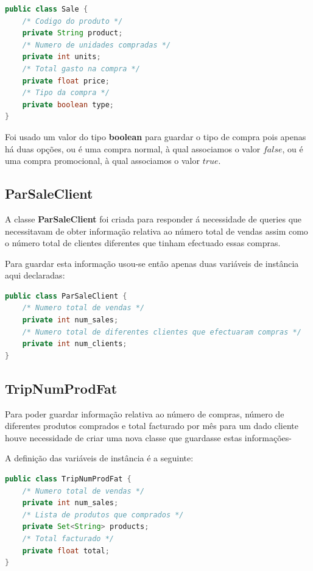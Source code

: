 \documentclass[10pt] {article}
\begin{document}
\begin{lstlisting}[language=Java]
public class Sale {
	/* Codigo do produto */
	private String product;
	/* Numero de unidades compradas */
	private int units;
	/* Total gasto na compra */
	private float price;
	/* Tipo da compra */
	private boolean type;
}
\end{lstlisting}

\par Foi usado um valor do tipo \textbf{boolean} para guardar o tipo de compra pois apenas há duas opções, ou é uma compra 
normal, à qual associamos o valor $false$, ou é uma compra promocional, à qual associamos o valor $true$.

\subsection{ParSaleClient}
\par A classe \textbf{ParSaleClient} foi criada para responder á necessidade de queries que necessitavam de obter informação 
relativa ao número total de vendas assim como o número total de clientes diferentes que tinham efectuado essas compras.
\par Para guardar esta informação usou-se então apenas duas variáveis de instância aqui declaradas:

\begin{lstlisting}[language=Java]
public class ParSaleClient {
	/* Numero total de vendas */
	private int num_sales;
	/* Numero total de diferentes clientes que efectuaram compras */
	private int num_clients;
}
\end{lstlisting}

\subsection{TripNumProdFat}
\par Para poder guardar informação relativa ao número de compras, número de diferentes produtos comprados e total 
facturado por mês para um dado cliente houve necessidade de criar uma nova classe que guardasse estas informações-
\par A definição das variáveis de instância é a seguinte:

\begin{lstlisting}[language=Java]
public class TripNumProdFat {
	/* Numero total de vendas */
	private int num_sales;
	/* Lista de produtos que comprados */
	private Set<String> products;
	/* Total facturado */
	private float total;
}
\end{lstlisting}
\end{document}
